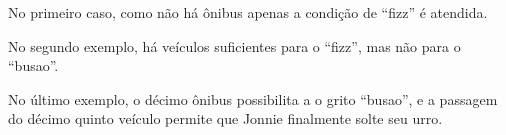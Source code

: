 No primeiro caso, como não há ônibus apenas a condição de ``fizz'' é atendida.

No segundo exemplo, há veículos suficientes para o ``fizz'', mas não para o ``busao''.

No último exemplo, o décimo ônibus possibilita a o grito ``busao'', e a passagem do décimo quinto veículo permite que Jonnie finalmente solte seu urro.